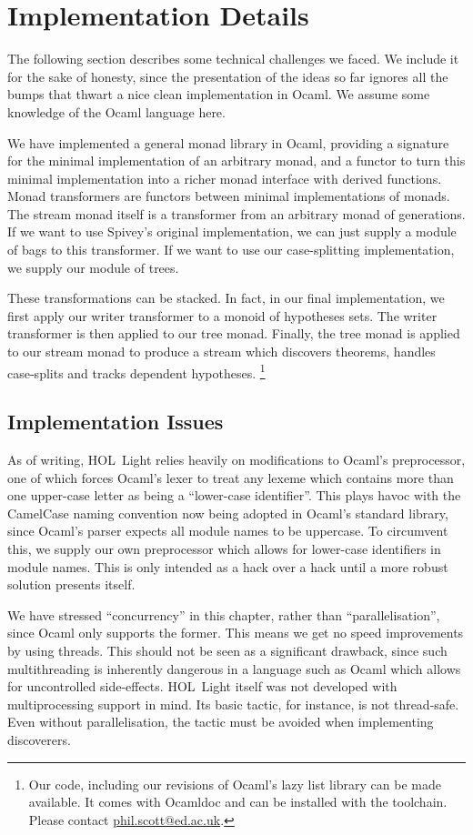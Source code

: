 \section{Implementation Details}
The following section describes some technical challenges we faced. We include it for the sake of honesty, since the presentation of the ideas so far ignores all the bumps that thwart a nice clean implementation in Ocaml. We assume some knowledge of the Ocaml language here.

We have implemented a general monad library in Ocaml, providing a signature for the minimal implementation of an arbitrary monad, and a functor to turn this minimal implementation into a richer monad interface with derived functions. Monad transformers are functors between minimal implementations of monads. The stream monad itself is a transformer from an arbitrary monad of generations. If we want to use Spivey's original implementation, we can just supply a module of bags to this transformer. If we want to use our case-splitting implementation, we supply our module of trees. 

These transformations can be stacked. In fact, in our final implementation, we first apply our writer transformer to a monoid of hypotheses sets. The writer transformer is then applied to our tree monad. Finally, the tree monad is applied to our stream monad to produce a stream which discovers theorems, handles case-splits and tracks dependent hypotheses. \footnote{Our code, including our revisions of Ocaml's lazy list library can be made available. It comes with Ocamldoc and can be installed with the  toolchain. Please contact \url{phil.scott@ed.ac.uk}.}

\subsection{Implementation Issues}
As of writing, HOL~Light relies heavily on modifications to Ocaml's preprocessor, one of which forces Ocaml's lexer to treat any lexeme which contains more than one upper-case letter as being a ``lower-case identifier''. This plays havoc with the CamelCase naming convention now being adopted in Ocaml's standard library, since Ocaml's parser expects all module names to be uppercase. To circumvent this, we supply our own preprocessor which allows for lower-case identifiers in module names. This is only intended as a hack over a hack until a more robust solution presents itself.

We have stressed ``concurrency'' in this chapter, rather than ``parallelisation'', since Ocaml only supports the former. This means we get no speed improvements by using threads. This should not be seen as a significant drawback, since such multithreading is inherently dangerous in a language such as Ocaml which allows for uncontrolled side-effects. HOL~Light itself was not developed with multiprocessing support in mind. Its basic  tactic, for instance, is not thread-safe. Even without parallelisation, the tactic must be avoided when implementing discoverers.

